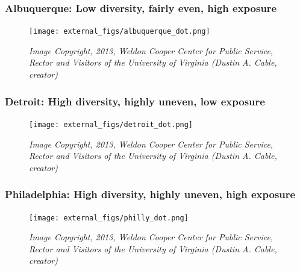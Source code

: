 \documentclass{beamer}
\begin{document}
	\begin{frame}\frametitle{Albuquerque: Low diversity, fairly even, high exposure}
		\begin{figure}
			\texttt{[image: external\_figs/albuquerque\_dot.png]}
			\caption{\textit{Image Copyright, 2013, Weldon Cooper Center for Public Service, Rector and Visitors of the University of Virginia (Dustin A. Cable, creator)}}
		\end{figure}
	\end{frame}


	\begin{frame}\frametitle{Detroit: High diversity, highly uneven, low exposure}
		\begin{figure}
			\texttt{[image: external\_figs/detroit\_dot.png]}
			\caption{\textit{Image Copyright, 2013, Weldon Cooper Center for Public Service, Rector and Visitors of the University of Virginia (Dustin A. Cable, creator)}}
		\end{figure}
	\end{frame}


	\begin{frame}\frametitle{Philadelphia: High diversity, highly uneven, high exposure}
		\begin{figure}
			\texttt{[image: external\_figs/philly\_dot.png]}
			\caption{\textit{Image Copyright, 2013, Weldon Cooper Center for Public Service, Rector and Visitors of the University of Virginia (Dustin A. Cable, creator)}}
		\end{figure}
	\end{frame}

\end{document}
